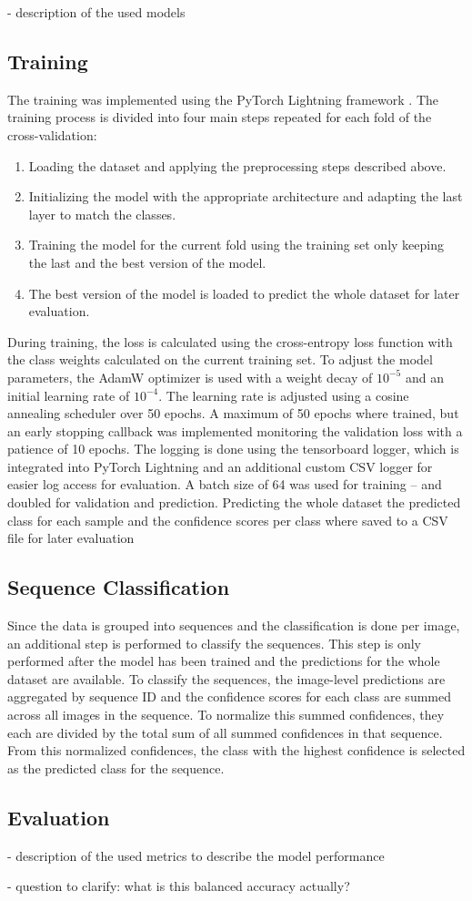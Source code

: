     - description of the used models

    \subsection{Training}

    The training was implemented using the PyTorch Lightning framework \autocite{falconPyTorchLightning2025}.
    The training process is divided into four main steps repeated for each fold of the cross-validation:
    \begin{enumerate}
        \item Loading the dataset and applying the preprocessing steps described above.
        \item Initializing the model with the appropriate architecture and adapting the last layer to match the classes.
        \item Training the model for the current fold using the training set only keeping the last and the best version of the model.
        \item The best version of the model is loaded to predict the whole dataset for later evaluation.
    \end{enumerate}

    During training, the loss is calculated using the cross-entropy loss function with the class weights calculated on the current training set.
    To adjust the model parameters, the AdamW optimizer \autocite{loshchilovDecoupledWeightDecay2019} is used with a weight decay of $10^{-5}$ and an initial learning rate of $10^{-4}$.
    The learning rate is adjusted using a cosine annealing scheduler \autocite{loshchilovSGDRStochasticGradient2017} over 50 epochs.
    A maximum of 50 epochs where trained, but an early stopping callback was implemented monitoring the validation loss with a patience of 10 epochs.
    The logging is done using the tensorboard logger, which is integrated into PyTorch Lightning and an additional custom CSV logger for easier log access for evaluation.
    A batch size of 64 was used for training -- and doubled for validation and prediction.
    Predicting the whole dataset the predicted class for each sample and the confidence scores per class where saved to a CSV file for later evaluation

    \subsection{Sequence Classification}
    Since the data is grouped into sequences and the classification is done per image, an additional step is performed to classify the sequences.
    This step is only performed after the model has been trained and the predictions for the whole dataset are available.
    To classify the sequences, the image-level predictions are aggregated by sequence ID and the confidence scores for each class are summed across all images in the sequence.
    To normalize this summed confidences, they each are divided by the total sum of all summed confidences in that sequence.
    From this normalized confidences, the class with the highest confidence is selected as the predicted class for the sequence.

    \subsection{Evaluation}
    - description of the used metrics to describe the model performance

    - question to clarify: what is this balanced accuracy actually?
